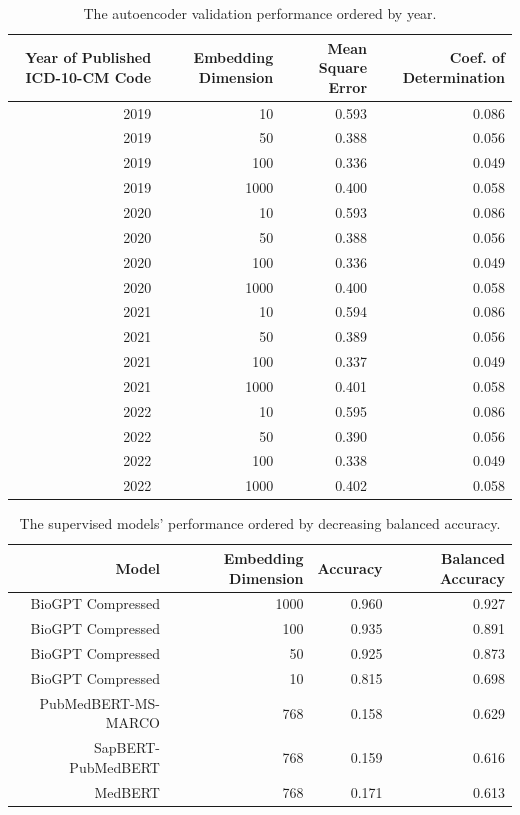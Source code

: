 \documentclass{bmcart}
\begin{document}
\begin{backmatter}
\begin{table}[ht!]
\begin{tabular}{|r|r|r|r|}
\hline
\end{tabular}
\end{table}

\begin{table}[ht!]
\caption{The autoencoder validation performance ordered by year.}
\label{tab:autoencoder_year}
\begin{tabular}{|r|r|r|r|}
\hline
Year of Published ICD-10-CM Code& Embedding Dimension & Mean Square Error& Coef. of Determination\\
\hline
2019 & 10 & 0.593 & 0.086\\
\hline
2019 & 50 & 0.388 & 0.056\\
\hline
2019 & 100 & 0.336 & 0.049\\
\hline
2019 & 1000 & 0.400 & 0.058\\
\hline
2020 & 10 & 0.593 & 0.086\\
\hline
2020 & 50 & 0.388 & 0.056\\
\hline
2020 & 100 & 0.336 & 0.049\\
\hline
2020 & 1000 & 0.400 & 0.058\\
\hline
2021 & 10 & 0.594 & 0.086\\
\hline
2021 & 50 & 0.389 & 0.056\\
\hline
2021 & 100 & 0.337 & 0.049\\
\hline
2021 & 1000 & 0.401 & 0.058\\
\hline
2022 & 10 & 0.595 & 0.086\\
\hline
2022 & 50 & 0.390 & 0.056\\
\hline
2022 & 100 & 0.338 & 0.049\\
\hline
2022 & 1000 & 0.402 & 0.058\\
\hline
\end{tabular}
\end{table}

\begin{table}[ht!]
\caption{The supervised models' performance ordered by decreasing balanced accuracy.}
\label{tab:sup_perf}
\begin{tabular}{|r|r|r|r|}
\hline
Model & Embedding Dimension & Accuracy & Balanced Accuracy\\
\hline
BioGPT Compressed & 1000 & 0.960 & 0.927\\
\hline
BioGPT Compressed & 100 & 0.935 & 0.891\\
\hline
BioGPT Compressed & 50 & 0.925 & 0.873\\
\hline
BioGPT Compressed & 10 & 0.815 & 0.698\\
\hline
PubMedBERT-MS-MARCO & 768 & 0.158 & 0.629\\
\hline
SapBERT-PubMedBERT & 768 & 0.159 & 0.616\\
\hline
MedBERT & 768 & 0.171 & 0.613\\
\hline
\end{tabular}
\end{table}



\end{backmatter}
\end{document}
